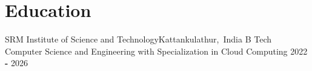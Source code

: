 \section*{Education}
\resumeSubHeadingListStart

\resumeSubheading
{SRM Institute of Science and Technology}{Kattankulathur,\, India}
{B Tech Computer Science and Engineering with Specialization in Cloud Computing}
{2022 \textbf{-} 2026} 

\resumeSubHeadingListEnd